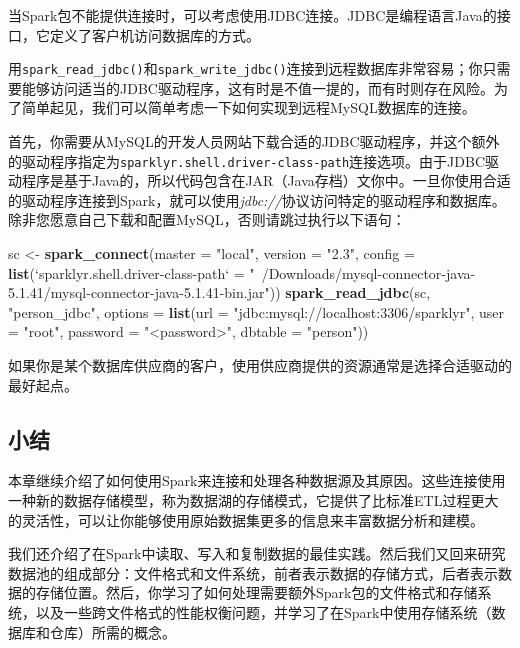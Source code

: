 \documentclass[
]{article}
\newenvironment{Shaded}{\begin{snugshade}}{\end{snugshade}}
\newcommand{\DataTypeTok}[1]{\textcolor[rgb]{0.13,0.29,0.53}{#1}}
\newcommand{\KeywordTok}[1]{\textcolor[rgb]{0.13,0.29,0.53}{\textbf{#1}}}
\newcommand{\NormalTok}[1]{#1}
\newcommand{\StringTok}[1]{\textcolor[rgb]{0.31,0.60,0.02}{#1}}
\begin{document}
当Spark包不能提供连接时，可以考虑使用JDBC连接。JDBC是编程语言Java的接口，它定义了客户机访问数据库的方式。

用\texttt{spark\_read\_jdbc()}和\texttt{spark\_write\_jdbc()}连接到远程数据库非常容易；你只需要能够访问适当的JDBC驱动程序，这有时是不值一提的，而有时则存在风险。为了简单起见，我们可以简单考虑一下如何实现到远程MySQL数据库的连接。

首先，你需要从MySQL的开发人员网站下载合适的JDBC驱动程序，并这个额外的驱动程序指定为\texttt{sparklyr.shell.driver-class-path}连接选项。由于JDBC驱动程序是基于Java的，所以代码包含在JAR（Java存档）文你中。一旦你使用合适的驱动程序连接到Spark，就可以使用\emph{jdbc://}协议访问特定的驱动程序和数据库。除非您愿意自己下载和配置MySQL，否则请跳过执行以下语句：

\begin{Shaded}
\begin{Highlighting}[]
\NormalTok{sc <-}\StringTok{ }\KeywordTok{spark_connect}\NormalTok{(}\DataTypeTok{master =} \StringTok{"local"}\NormalTok{, }\DataTypeTok{version =} \StringTok{"2.3"}\NormalTok{, }\DataTypeTok{config =} \KeywordTok{list}\NormalTok{(}\StringTok{`}\DataTypeTok{sparklyr.shell.driver-class-path}\StringTok{`}\NormalTok{ =}\StringTok{ "~/Downloads/mysql-connector-java-5.1.41/mysql-connector-java-5.1.41-bin.jar"}\NormalTok{))}
\KeywordTok{spark_read_jdbc}\NormalTok{(sc, }\StringTok{"person_jdbc"}\NormalTok{, }\DataTypeTok{options =} \KeywordTok{list}\NormalTok{(}\DataTypeTok{url =} \StringTok{"jdbc:mysql://localhost:3306/sparklyr"}\NormalTok{, }
    \DataTypeTok{user =} \StringTok{"root"}\NormalTok{, }\DataTypeTok{password =} \StringTok{"<password>"}\NormalTok{, }\DataTypeTok{dbtable =} \StringTok{"person"}\NormalTok{))}
\end{Highlighting}
\end{Shaded}

如果你是某个数据库供应商的客户，使用供应商提供的资源通常是选择合适驱动的最好起点。

\hypertarget{ux5c0fux7ed3-6}{%
\subsection{小结}\label{ux5c0fux7ed3-6}}

本章继续介绍了如何使用Spark来连接和处理各种数据源及其原因。这些连接使用一种新的数据存储模型，称为数据湖的存储模式，它提供了比标准ETL过程更大的灵活性，可以让你能够使用原始数据集更多的信息来丰富数据分析和建模。

我们还介绍了在Spark中读取、写入和复制数据的最佳实践。然后我们又回来研究数据池的组成部分：文件格式和文件系统，前者表示数据的存储方式，后者表示数据的存储位置。然后，你学习了如何处理需要额外Spark包的文件格式和存储系统，以及一些跨文件格式的性能权衡问题，并学习了在Spark中使用存储系统（数据库和仓库）所需的概念。
\end{document}
